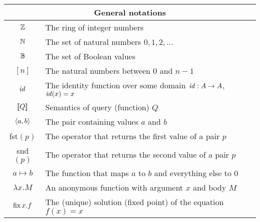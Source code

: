 \noindent
\begin{center}
\begin{tabular}{|c|p{10cm}|} \hline

\multicolumn{2}{|c|}{General notations} \\ \hline
$\mathbb{Z}$ & The ring of integer numbers \\
$\mathbb{N}$ & The set of natural numbers $0, 1, 2, \ldots$ \\
$\mathbb{B}$ & The set of Boolean values \\
$[n]$ & The natural numbers between 0 and $n-1$ \\
$\mathit{id}$ & The identity function over some domain $\mathit{id}: A \to A$, $\mathit{id}(x) = x$ \\
$\llbracket Q \rrbracket$ & Semantics of query (function) $Q$ \\
$\langle a,b \rangle$ & The pair containing values $a$ and $b$ \\
fst$(p)$ & The operator that returns the first value of a pair $p$ \\
snd$(p)$ & The operator that returns the second value of a pair $p$ \\
$a \mapsto b$ & The function that maps $a$ to $b$ and everything else to 0 \\
$\lambda x.M$ & An anonymous function with argument $x$ and body $M$ \\
$\mbox{fix}\,x.f$ & The (unique) solution (fixed point) of the equation $f(x) = x$ \\
\hline
\end{tabular}


\end{center}

